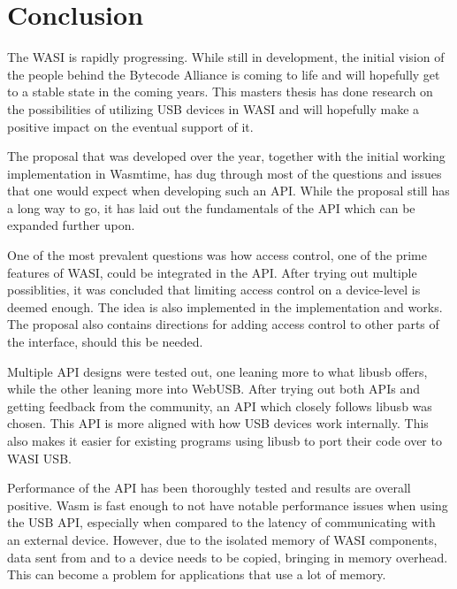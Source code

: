 \chapter{Conclusion}

The \acrfull{WASI} is rapidly progressing. While still in development, the initial vision of the people behind the Bytecode Alliance is coming to life and will hopefully get to a stable state in the coming years. This masters thesis has done research on the possibilities of utilizing \acrshort{USB} devices in \acrshort{WASI} and will hopefully make a positive impact on the eventual support of it. 

The proposal that was developed over the year, together with the initial working implementation in Wasmtime, has dug through most of the questions and issues that one would expect when developing such an \acrshort{API}. While the proposal still has a long way to go, it has laid out the fundamentals of the \acrshort{API} which can be expanded further upon.

One of the most prevalent questions was how access control, one of the prime features of \acrshort{WASI}, could be integrated in the \acrshort{API}. After trying out multiple possiblities, it was concluded that limiting access control on a device-level is deemed enough. The idea is also implemented in the implementation and works. The proposal also contains directions for adding access control to other parts of the interface, should this be needed.

Multiple \acrshort{API} designs were tested out, one leaning more to what libusb offers, while the other leaning more into WebUSB. After trying out both \acrshort{API}s and getting feedback from the community, an \acrshort{API} which closely follows libusb was chosen. This \acrshort{API} is more aligned with how \acrshort{USB} devices work internally. This also makes it easier for existing programs using libusb to port their code over to \acrshort{WASI} \acrshort{USB}.

Performance of the \acrshort{API} has been thoroughly tested and results are overall positive. \acrfull{Wasm} is fast enough to not have notable performance issues when using the \acrshort{USB} \acrshort{API}, especially when compared to the latency of communicating with an external device. However, due to the isolated memory of \acrshort{WASI} components, data sent from and to a device needs to be copied, bringing in memory overhead. This can become a problem for applications that use a lot of memory.

